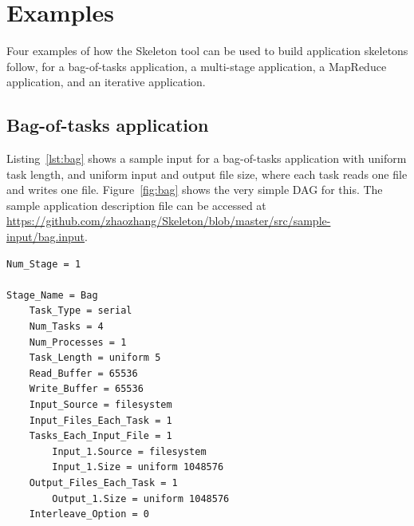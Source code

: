 \documentclass[10pt,a4paper]{article}
\begin{document}
\section{Examples}

Four examples of how the Skeleton tool can be used to build application skeletons follow, for a bag-of-tasks application, a multi-stage application, a MapReduce application, and an iterative application.  


\subsection{Bag-of-tasks application}

Listing~\ref{lst:bag} shows a sample input for a bag-of-tasks application with uniform task length, and uniform input and output file size, where each task reads one file and writes one file. Figure~\ref{fig:bag} shows the very simple DAG for this. The sample application description file can be accessed at \url{https://github.com/zhaozhang/Skeleton/blob/master/src/sample-input/bag.input}.

\begin{lstlisting}[caption=Sample input for a bag-of-tasks application, label=lst:bag, linewidth=1.0\textwidth, xleftmargin=2.5ex]
Num_Stage = 1

Stage_Name = Bag
    Task_Type = serial
    Num_Tasks = 4  
    Num_Processes = 1
    Task_Length = uniform 5
    Read_Buffer = 65536
    Write_Buffer = 65536
    Input_Source = filesystem
    Input_Files_Each_Task = 1
    Tasks_Each_Input_File = 1
    	Input_1.Source = filesystem
    	Input_1.Size = uniform 1048576
    Output_Files_Each_Task = 1
        Output_1.Size = uniform 1048576
    Interleave_Option = 0    

\end{lstlisting}
\end{document}
